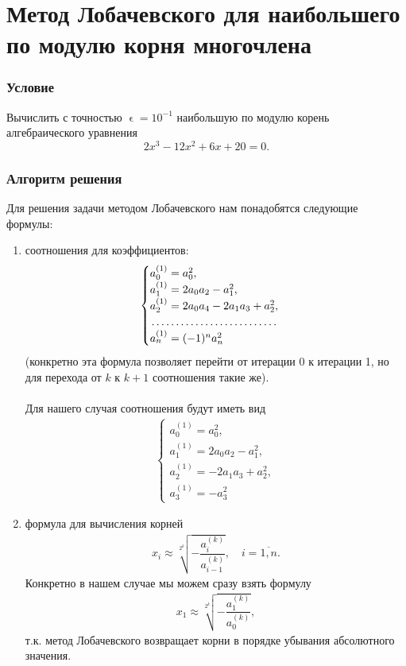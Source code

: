 \documentclass[a4paper, 12pt]{article}
\renewcommand{\epsilon}{\upvarepsilon}
\begin{document}
	\section*{Метод Лобачевского для наибольшего по модулю корня многочлена}
	\subsubsection*{Условие}
	Вычислить с точностью $\epsilon=10^{-1}$ наибольшую по модулю корень алгебраического уравнения $$2x^3-12x^2+6x +20 = 0.$$
	\subsubsection*{Алгоритм решения}
	Для решения задачи методом Лобачевского нам понадобятся следующие формулы:
	\begin{enumerate}
		\item соотношения для коэффициентов: 
		\begin{eqnarray}
		\begin{cases}
				a_0^{(1)} = a_0^2,\\
				a_1^{(1)} =2a_0a_2 - a_1^2,\\
				a_2^{(1)} = 2a_0a_4 - 2a_1a_3 + a_2^2,\\
				\dotfill\\
				a_n^{(1)} = (-1)^na_n^2
		\end{cases}
		\end{eqnarray}
		(конкретно эта формула позволяет перейти от итерации 0 к итерации 1, но для перехода от $k$ к $k+1$ соотношения такие же).\\\\
		Для нашего случая соотношения будут иметь вид
		\begin{eqnarray}
			\begin{cases}
			a_0^{(1)} = a_0^2,\\
			a_1^{(1)} =2a_0a_2 - a_1^2,\\
			a_2^{(1)} = - 2a_1a_3 + a_2^2,\\
			a_3^{(1)} = -a_3^2
		\end{cases}
		\end{eqnarray}
		\item формула для вычисления корней \begin{eqnarray}
			x_i\approx\sqrt[2^k]{ - \dfrac{a_i^{(k)}}{a_{i-1}^{(k)}}},\quad i =\overline{1,n}.
		\end{eqnarray}
		Конкретно в нашем случае мы можем сразу взять формулу \begin{eqnarray}
			x_1\approx\sqrt[2^k]{ - \dfrac{a_1^{(k)}}{a_{0}^{(k)}}},
		\end{eqnarray}
		т.к. метод Лобачевского возвращает корни в порядке убывания абсолютного значения.
	\end{enumerate} 
\end{document}
